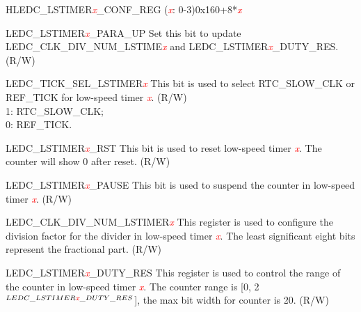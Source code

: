\begin{register}{H}{LEDC\_LSTIMER\textcolor{red}{\it{x}}\_CONF\_REG (\textcolor{red}{\it{x}}: 0-3)}{0x160+8*\textcolor{red}{\it{x}}}\label{regdesc:LEDCLSTIMERnCONFREG}
%
%
%
%
%
%
%
\regnewline%
\begin{regdesc}\begin{reglist}
\item [LEDC\_LSTIMER\textcolor{red}{\it{x}}\_PARA\_UP]Set this bit  to update  LEDC\_CLK\_DIV\_NUM\_LSTIME\textcolor{red}{\it{x}} and  LEDC\_LSTIMER\textcolor{red}{\it{x}}\_DUTY\_RES. (R/W)
\item [LEDC\_TICK\_SEL\_LSTIMER\textcolor{red}{\it{x}}]This bit is used to select RTC\_SLOW\_CLK or REF\_TICK for low-speed timer \textcolor{red}{\it{x}}. (R/W) \\1: RTC\_SLOW\_CLK; \\0: REF\_TICK.
\item [LEDC\_LSTIMER\textcolor{red}{\it{x}}\_RST]This bit is used to reset low-speed timer \textcolor{red}{\it{x}}. The counter will show 0 after reset. (R/W)
\item [LEDC\_LSTIMER\textcolor{red}{\it{x}}\_PAUSE]This bit is used to suspend the counter in low-speed timer \textcolor{red}{\it{x}}. (R/W)
\item [LEDC\_CLK\_DIV\_NUM\_LSTIMER\textcolor{red}{\it{x}}]This register is used to configure the division factor for the divider in low-speed timer \textcolor{red}{\it{x}}. The least significant eight bits represent the fractional part. (R/W)
\item [LEDC\_LSTIMER\textcolor{red}{\it{x}}\_DUTY\_RES]This register is used to control the range of the counter in low-speed timer \textcolor{red}{\it{x}}. The counter range is [0, 2$ ^{LEDC\_LSTIMER\textcolor{red}{\it{x}}\_DUTY\_RES}$], the max bit width for counter is 20. (R/W)
\end{reglist}\end{regdesc}
\end{register}


